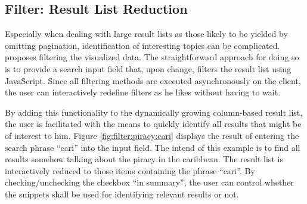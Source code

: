 \subsection{Filter: Result List Reduction}
Especially when dealing with large result lists as those likely to be yielded by omitting pagination, identification of interesting topics can be complicated. \cite{Shneiderman1996} proposes filtering the visualized data. The straightforward approach for doing so is to provide a search input field that, upon change, filters the result list using JavaScript. Since all filtering methods are executed asynchronously on the client, the user can interactively redefine filters as he likes without having to wait. 

By adding this functionality to the dynamically growing column-based result list, the user is facilitated with the means to quickly identify all results that might be of interest to him. Figure \ref{fig:filter:piracy:cari} displays the result of entering the search phrase ``cari'' into the input field. The intend of this example is to find all results somehow talking about the piracy in the caribbean. The result list is interactively reduced to those items containing the phrase ``cari''. By checking/unchecking the checkbox ``in summary'', the user can control whether the snippets shall be used for identifying relevant results or not.